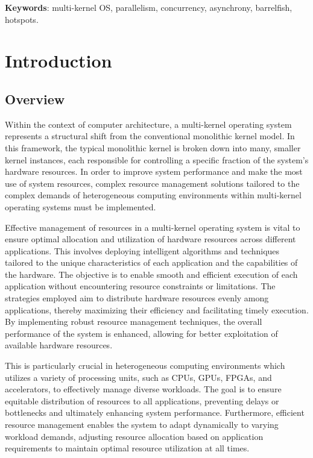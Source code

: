 \documentclass[16pt,a4paper]{article}
\begin{document}
\textbf{Keywords}: multi-kernel OS, parallelism, concurrency, asynchrony, barrelfish, hotspots.  

\clearpage

\section{Introduction}
\subsection{Overview}
Within the context of computer architecture, a multi-kernel operating system  represents a structural shift from the conventional monolithic kernel model. In this framework, the typical monolithic kernel is broken down into many, smaller kernel instances, each responsible for controlling a specific fraction of the system's hardware resources. In order to improve system performance and make the most use of system resources, complex resource management solutions tailored to the complex demands of heterogeneous computing environments within multi-kernel operating systems must be implemented.

Effective management of resources in a multi-kernel operating system is vital to ensure optimal allocation and utilization of hardware resources across different applications. This involves deploying intelligent algorithms and techniques tailored to the unique characteristics of each application and the capabilities of the hardware. The objective is to enable smooth and efficient execution of each application without encountering resource constraints or limitations. The strategies employed aim to distribute hardware resources evenly among applications, thereby maximizing their efficiency and facilitating timely execution. By implementing robust resource management techniques, the overall performance of the system is enhanced, allowing for better exploitation of available hardware resources. 

This is particularly crucial in heterogeneous computing environments which utilizes a variety of processing units, such as CPUs, GPUs, FPGAs, and accelerators, to effectively manage diverse workloads. The goal is to ensure equitable distribution of resources to all applications, preventing delays or bottlenecks and ultimately enhancing system performance. Furthermore, efficient resource management enables the system to adapt dynamically to varying workload demands, adjusting resource allocation based on application requirements to maintain optimal resource utilization at all times.
\end{document}
